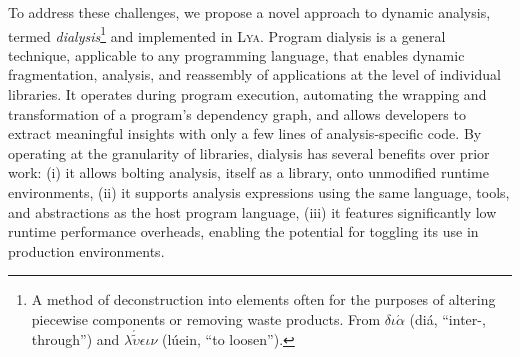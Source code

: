 \documentclass[letterpaper,twocolumn,10pt]{article}
\def\eg{{\em e.g.}, }
\newcommand{\heading}[1]{\vspace{2pt}\noindent\textbf{#1}\enspace}
\newcommand{\sys}{{\scshape Lya}\xspace}
\begin{document}
To address these challenges, we propose a novel approach to dynamic analysis, termed \emph{dialysis}\footnote{
  A method of deconstruction into elements often for the purposes of altering piecewise components or removing waste products.
  From %
  {\scriptsize $\delta\iota\acute{\alpha}$} (di\'{a}, ``inter-, through'') and {\scriptsize $\lambda\acute{\tilde{\upsilon}}\epsilon\iota\nu$} (lúein, ``to loosen'').
} and implemented in \sys.
Program dialysis is a general technique, applicable to any programming language, that enables dynamic fragmentation, analysis, and reassembly of applications at the level of individual libraries. 
It operates during program execution, automating the wrapping and transformation of a program's dependency graph, and allows developers to extract meaningful insights with only a few lines of analysis-specific code.
By operating at the granularity of libraries, dialysis has several benefits over prior work: %
  (i) it allows bolting analysis, itself as a library, onto unmodified runtime environments, %
  (ii) it supports analysis expressions using the same language, tools, and abstractions as the host program language,
  (iii) it features significantly low runtime performance overheads, enabling the potential for toggling its use in production environments.


% 
% 

% 
% 
% 
\end{document}
